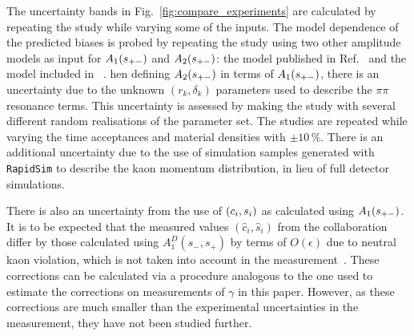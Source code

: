 The uncertainty bands in Fig.~\ref{fig:compare_experiments} are calculated by repeating the study while varying some of the inputs. The model dependence of the predicted biases is probed by repeating the study using two other amplitude models as input for $A_1(s_{+-})$ and $A_2(s_{+-})$: the model published in Ref.~\cite{BELLE2010} and the model included in \normalfont~\cite{EvtGen}. 
hen defining $A_2(s_{+-})$ in terms of $A_1(s_{+-})$, there is an uncertainty due to the unknown $(r_k, \delta_k)$ parameters used to describe the $\pi\pi$ resonance terms. This uncertainty is assessed by making the study with several different random realisations of the parameter set. 
The studies are repeated while varying the time acceptances and material densities with $\pm 10\,\%$. 
There is an additional uncertainty due to the use of simulation samples generated with \texttt{RapidSim} to describe the kaon momentum distribution, in lieu of full detector simulations. 

There is also an uncertainty from the use of $(c_i, s_i)$ as calculated using $A_1(s_{+-})$. It is to be expected that the measured values $(\hat c_i, \hat s_i)$ from the \cleo collaboration differ by those calculated using $A_1^D(s_-,s_+)$ by terms of $O(\epsilon)$ due to neutral kaon \CP violation, which is not taken into account in the measurement~\cite{CLEOCISI}. These corrections can be calculated via a procedure analogous to the one used to estimate the corrections on measurements of $\gamma$ in this paper. However, as these corrections are much smaller than the experimental uncertainties in the measurement, they have not been studied further.




